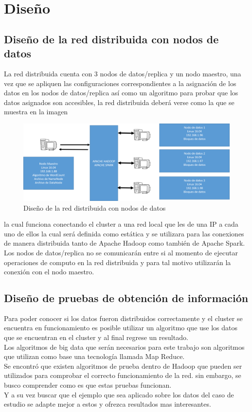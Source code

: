 \section{Diseño}
\subsection{Diseño de la red distribuida con nodos de datos}
La red distribuida cuenta con 3 nodos de datos/replica y un nodo maestro, una vez que se apliquen las configuraciones correspondientes a la asignación de los datos en los nodos de datos/replica así como un algoritmo para probar que los datos asignados son accesibles, la red distribuida deberá verse como la que se muestra en la imagen 
\newpage
\begin{figure}[!htbp]
	\hypertarget{fig:redi3}{\hspace{1pt}}
	\begin{center}
		\includegraphics[width=.7\textwidth]{capitulo4/images/im3.png}
		\caption{Diseño de la red distribuida con nodos de datos}
		\label{fig:redi3}
	\end{center}
\end{figure}
la cual funciona conectando el cluster a una red local que les de una IP a cada uno de ellos la cual será definida como estática y se utilizara para las conexiones de manera distribuida tanto de Apache Hadoop como también de Apache Spark. 
\\
Los nodos de datos/replica no se comunicarán entre si al momento de ejecutar operaciones de computo en la red distribuida y para tal motivo utilizarán la conexión con el nodo maestro.
\\
\subsection{Diseño de pruebas de obtención de información}
\label{osh}
Para poder conocer si los datos fueron distribuidos correctamente y el cluster se encuentra en funcionamiento es posible utilizar un algoritmo que use los datos que se encuentran en el cluster y al final regrese un resultado.
\\
Los algoritmos de big data que serán necesarios para este trabajo son algoritmos que utilizan como base una tecnología llamada Map Reduce.
\\
Se encontró que existen algoritmos de prueba dentro de Hadoop que pueden ser utilizados para comprobar el correcto funcionamiento de la red. sin embargo, se busco comprender como es que estas pruebas funcionan.
\\
Y a su vez buscar que el ejemplo que sea aplicado sobre los datos del caso de estudio se adapte mejor a estos y ofrezca resultados mas interesantes.  
\\
